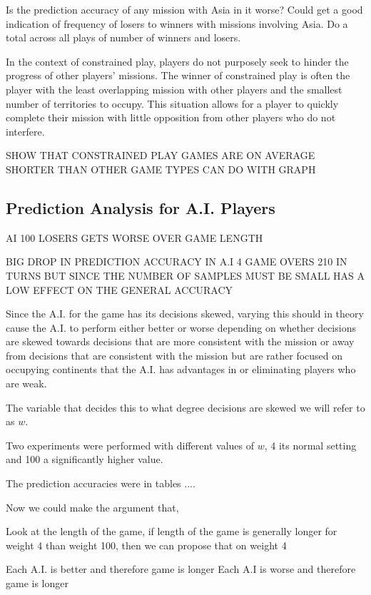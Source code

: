 \documentclass[parskip]{cs4rep}
\begin{document}
Is the prediction accuracy of any mission with Asia in it worse? Could get a good indication of frequency of losers to winners with missions involving Asia. Do a total across all plays of number of winners and losers.

In the context of constrained play, players do not purposely seek to hinder the progress of other players' missions. The winner of constrained play is often the player with the least overlapping mission with other players and the smallest number of territories to occupy. This situation allows for a player to quickly complete their mission with little opposition from other players who do not interfere.

SHOW THAT CONSTRAINED PLAY GAMES ARE ON AVERAGE SHORTER THAN OTHER GAME TYPES CAN DO WITH GRAPH

\subsection{Prediction Analysis for A.I. Players}

AI 100 LOSERS GETS WORSE OVER GAME LENGTH

BIG DROP IN PREDICTION ACCURACY IN A.I 4 GAME OVERS 210 IN TURNS BUT SINCE THE NUMBER OF SAMPLES MUST BE SMALL HAS A LOW EFFECT ON THE GENERAL ACCURACY

Since the A.I. for the game has its decisions skewed, varying this should in theory cause the A.I. to perform either better or worse depending on whether decisions are skewed towards decisions that are more consistent with the mission or away from decisions that are consistent with the mission but are rather focused on occupying continents that the A.I. has advantages in or eliminating players who are weak.

The variable that decides this to what degree decisions are skewed we will refer to as $w$.

Two experiments were performed with different values of $w$, 4 its normal setting and 100 a significantly higher value.

The prediction accuracies were in tables ....

Now we could make the argument that, 

Look at the length of the game, if length of the game is generally longer for weight 4 than weight 100, then we can propose that on weight 4

Each A.I. is better and therefore game is longer
Each A.I is worse and therefore game is longer
\end{document}
